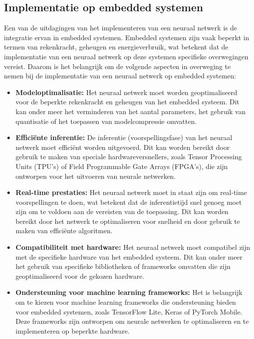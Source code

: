 \subsection{Implementatie op embedded systemen}
Een van de uitdagingen van het implementeren van een neuraal netwerk is de integratie ervan in embedded systemen. Embedded systemen zijn vaak beperkt in termen van rekenkracht, geheugen en energieverbruik, wat betekent dat de implementatie van een neuraal netwerk op deze systemen specifieke overwegingen vereist. Daarom is het belangrijk om de volgende aspecten in overweging te nemen bij de implementatie van een neuraal netwerk op embedded systemen:
\begin{itemize}
  \item \textbf{Modeloptimalisatie:} Het neuraal netwerk moet worden geoptimaliseerd voor de beperkte rekenkracht en geheugen van het embedded systeem. Dit kan onder meer het verminderen van het aantal parameters, het gebruik van quantisatie of het toepassen van modelcompressie omvatten.
  \item \textbf{Efficiënte inferentie:} De inferentie (voorspellingsfase) van het neuraal netwerk moet efficiënt worden uitgevoerd. Dit kan worden bereikt door gebruik te maken van speciale hardwareversnellers, zoals Tensor Processing Units (TPU's) of Field Programmable Gate Arrays (FPGA's), die zijn ontworpen voor het uitvoeren van neurale netwerken.
  \item \textbf{Real-time prestaties:} Het neuraal netwerk moet in staat zijn om real-time voorspellingen te doen, wat betekent dat de inferentietijd snel genoeg moet zijn om te voldoen aan de vereisten van de toepassing. Dit kan worden bereikt door het netwerk te optimaliseren voor snelheid en door gebruik te maken van efficiënte algoritmen.
  \item \textbf{Compatibiliteit met hardware:} Het neuraal netwerk moet compatibel zijn met de specifieke hardware van het embedded systeem. Dit kan onder meer het gebruik van specifieke bibliotheken of frameworks omvatten die zijn geoptimaliseerd voor de gekozen hardware.
  \item \textbf{Ondersteuning voor machine learning frameworks:} Het is belangrijk om te kiezen voor machine learning frameworks die ondersteuning bieden voor embedded systemen, zoals TensorFlow Lite, Keras of PyTorch Mobile. Deze frameworks zijn ontworpen om neurale netwerken te optimaliseren en te implementeren op beperkte hardware.
\end{itemize}
 
